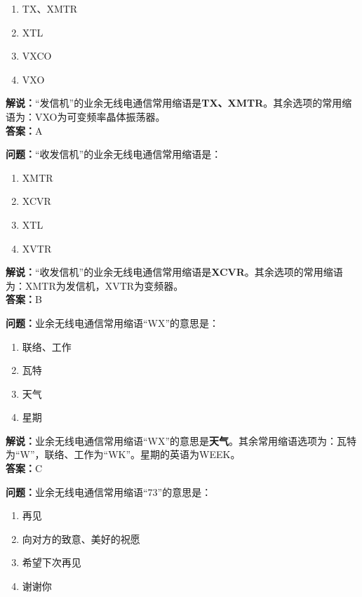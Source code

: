 \documentclass{ctexbook}
\begin{document}
\begin{enumerate}[label=\Alph*), leftmargin=3em]
	\item TX、XMTR
	\item XTL
	\item VXCO
	\item VXO
\end{enumerate}

\noindent\textbf{解说：}“发信机”的业余无线电通信常用缩语是\textbf{TX、XMTR}。其余选项的常用缩语为：VXO为可变频率晶体振荡器。\\\noindent\textbf{答案：}A


\bigskip


\noindent\textbf{问题：}“收发信机”的业余无线电通信常用缩语是：

\begin{enumerate}[label=\Alph*), leftmargin=3em]
	\item XMTR
	\item XCVR
	\item XTL
	\item XVTR
\end{enumerate}

\noindent\textbf{解说：}“收发信机”的业余无线电通信常用缩语是\textbf{XCVR}。其余选项的常用缩语为：XMTR为发信机，XVTR为变频器。\\\noindent\textbf{答案：}B


\bigskip


\noindent\textbf{问题：}业余无线电通信常用缩语“WX”的意思是：

\begin{enumerate}[label=\Alph*), leftmargin=3em]
	\item 联络、工作
	\item 瓦特
	\item 天气
	\item 星期
\end{enumerate}

\noindent\textbf{解说：}业余无线电通信常用缩语“WX”的意思是\textbf{天气}。其余常用缩语选项为：瓦特为“W”，联络、工作为“WK”。星期的英语为WEEK。\\\noindent\textbf{答案：}C


\bigskip


\noindent\textbf{问题：}业余无线电通信常用缩语“73”的意思是：

\begin{enumerate}[label=\Alph*), leftmargin=3em]
	\item 再见
	\item 向对方的致意、美好的祝愿
	\item 希望下次再见
	\item 谢谢你
\end{enumerate}
\end{document}
